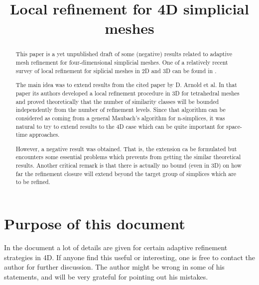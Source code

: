 \documentclass[a4paper,12pt]{amsart}
\title[Local refinement in 4D] 
{Local refinement for 4D simplicial meshes}
\numberwithin{equation}{section}
\begin{document}
 
\begin{abstract}
This paper is a yet unpublished draft of some (negative) results related to adaptive mesh refinement for four-dimensional simplicial meshes. One of a relatively recent survey of local refinement for siplicial meshes in 2D and 3D can be found in \cite{survey}.

The main idea was to extend results from the cited paper by D. Arnold et al. In that paper its authors developed a local refinement procedure in 3D for tetrahedral meshes and proved theoretically that the number of similarity classes will be bounded independently from the number of refinement levels.
Since that algorithm can be considered as coming from a general Maubach's algorithm for n-simplices, it was natural to try to extend results to the 4D case which can be quite important for space-time approaches.

However, a negative result was obtained. That is, the extension ca be formulated but encounters some essential problems which prevents from getting the similar theoretical results. Another critical remark is that there is actually no bound (even in 3D) on how far the refinement closure will extend beyond the target group of simplices which are to be refined.

\end{abstract}
\maketitle

\section{Purpose of this document}
In the document a lot of details are given for  certain adaptive refinement strategies in 4D. If anyone find this useful or interesting, one is free to contact the author for further discussion. The author might be wrong in some of his statements, and will be very grateful for pointing out his mistakes.
\end{document}
